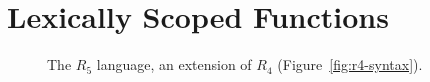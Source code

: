 \documentclass[11pt]{book}
\begin{document}
%
%
%
%
%
%
%
%

\chapter{Lexically Scoped Functions}
\label{ch:lambdas}

\begin{figure}[tbp]
\centering
{}
\caption{The $R_5$ language, an extension of $R_4$
  (Figure~\ref{fig:r4-syntax}).}
\label{fig:r5-syntax}
\end{figure}


\end{document}
